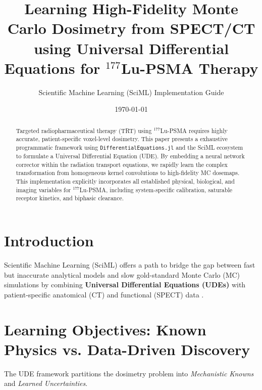 \documentclass[11pt,a4paper]{article}
\title{\textbf{Learning High-Fidelity Monte Carlo Dosimetry from SPECT/CT using Universal Differential Equations for $^{177}$Lu-PSMA Therapy}}
\author{Scientific Machine Learning (SciML) Implementation Guide}
\date{\today}
\begin{document}
\maketitle

\begin{abstract}
Targeted radiopharmaceutical therapy (TRT) using $^{177}$Lu-PSMA requires highly accurate, patient-specific voxel-level dosimetry. This paper presents a exhaustive programmatic framework using \texttt{DifferentialEquations.jl} \cite{Rackauckas_2017} and the SciML \cite{Rackauckas_2020} ecosystem to formulate a Universal Differential Equation (UDE). By embedding a neural network corrector within the radiation transport equations, we rapidly learn the complex transformation from homogeneous kernel convolutions to high-fidelity MC dosemaps. This implementation explicitly incorporates all established physical, biological, and imaging variables for $^{177}$Lu-PSMA, including system-specific calibration, saturable receptor kinetics, and biphasic clearance.
\end{abstract}

\section{Introduction}
Scientific Machine Learning (SciML) offers a path to bridge the gap between fast but inaccurate analytical models and slow gold-standard Monte Carlo (MC) simulations by combining \textbf{Universal Differential Equations (UDEs)} with patient-specific anatomical (CT) and functional (SPECT) data \cite{KennedyLugassi2020}.

\section{Learning Objectives: Known Physics vs. Data-Driven Discovery}

The UDE framework partitions the dosimetry problem into \textit{Mechanistic Knowns} and \textit{Learned Uncertainties}.
\end{document}
